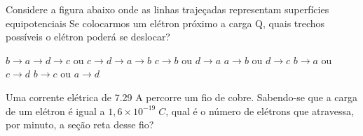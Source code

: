 \documentclass[12pt, addpoints]{exam}
\begin{document}
        \begin{questions}
\begin{multicols*}{2}
\question Considere a figura abaixo onde as linhas trajeçadas representam superfícies equipotenciais Se colocarmos um elétron próximo a carga Q, quais trechos possíveis o elétron poderá se deslocar?
        
        \begin{center}
            \begin{minipage}[c]{0.5\linewidth}
            \end{minipage}
        \end{center}
        
        

\begin{choices}
\choice $b\rightarrow a\rightarrow d\rightarrow c$ ou $c\rightarrow d\rightarrow a\rightarrow b$ 
\choice $c\rightarrow b$ ou $d\rightarrow a$ 
\choice $a\rightarrow b$ ou $d\rightarrow c$ 
\choice $b\rightarrow a$ ou $c\rightarrow d$ 
\choice $b\rightarrow c$ ou $a\rightarrow d$ 
\end{choices}
\question Uma corrente elétrica de    7.29 A percorre um ﬁo de cobre. Sabendo-se que a carga de um elétron é igual a $1,6\times 10^{-19}\;C$, qual é o número de elétrons que atravessa, por minuto, a seção reta desse ﬁo?


\end{multicols*}
\end{questions}
\end{document}

